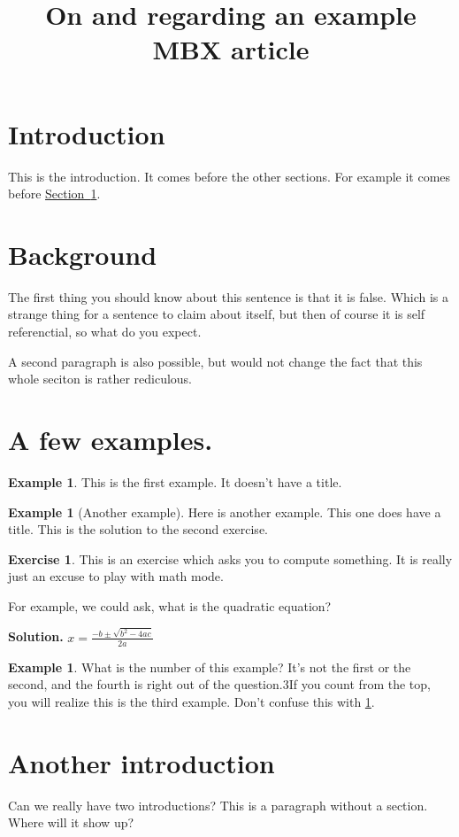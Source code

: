 \documentclass[10pt,]{article}
\title{On and regarding an example MBX article}
\date{}
\theoremstyle{plain}
\theoremstyle{definition}
\newtheorem{example}[theorem]{Example}
\newtheorem{exercise}[theorem]{Exercise}
\begin{document}
\thispagestyle{empty}
\maketitle
\typeout{************************************************}
\typeout{************************************************}
\section*{Introduction}
This is the introduction.  It comes before the other sections.  For example it comes before \hyperref[sec-background]{Section~\ref{sec-background}}.%
\typeout{************************************************}
\typeout{************************************************}
\section[Background]{Background}\label{sec-background}
The first thing you should know about this sentence is that it is false.  Which is a strange thing for a sentence to claim about itself, but then of course it is self referenctial, so what do you expect.%
\par
A second paragraph is also possible, but would not change the fact that this whole seciton is rather rediculous.%
\typeout{************************************************}
\typeout{************************************************}
\section[A few examples.]{A few examples.}\label{sec-examples}
\begin{example}\label{example-1}
This is the first example.  It doesn't have a title.%
\end{example}
\begin{example}[Another example]\label{ex-2}
Here is another example.  This one does have a title.%
This is the solution to the second exercise.\end{example}
\begin{exercise}\label{exercise-1}
This is an exercise which asks you to compute something.  It is really just an excuse to play with math mode.%
\par
For example, we could ask, what is the quadratic equation?%
\par\smallskip
\noindent\textbf{Solution.}\hypertarget{solution-2}{}\quad
\(x = \frac{-b \pm \sqrt{b^2 - 4ac}}{2a}\)%
\end{exercise}
\begin{example}\label{ex-3}
What is the number of this example?%
It's not the first or the second, and the fourth is right out of the question.3If you count from the top, you will realize this is the third example.  Don't confuse this with \hyperref[ex-2]{\ref{ex-2}}.%
\end{example}
\typeout{************************************************}
\typeout{************************************************}
\section*{Another introduction}
Can we really have two introductions?%
This is a paragraph without a section.  Where will it show up?%
\end{document}
